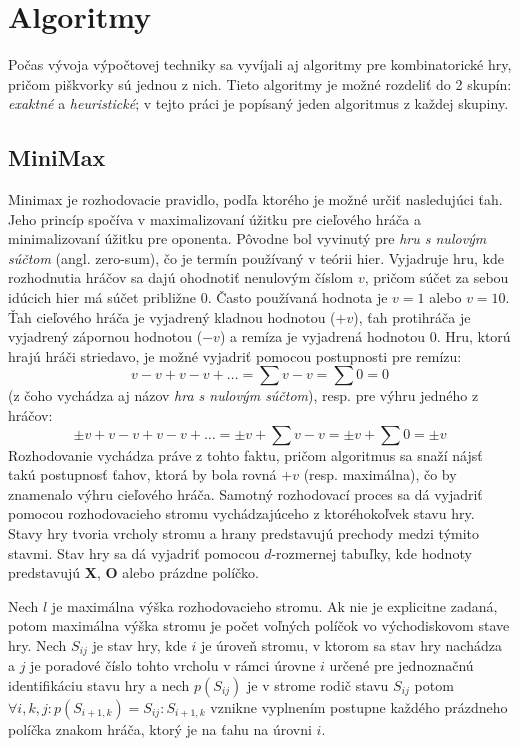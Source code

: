 \section{Algoritmy}\label{sec:algorithms}

Počas vývoja výpočtovej techniky sa vyvíjali aj algoritmy pre kombinatorické hry, pričom piškvorky sú jednou z nich.
Tieto algoritmy je možné rozdeliť do 2 skupín: \emph{exaktné} a \emph{heuristické}; v tejto práci je popísaný jeden
algoritmus z každej skupiny.

\subsection{MiniMax}\label{subsec:algo-minmax}


Minimax je rozhodovacie pravidlo, podľa ktorého je možné určiť nasledujúci ťah.
Jeho princíp spočíva v maximalizovaní úžitku pre cieľového hráča a minimalizovaní úžitku pre oponenta.
Pôvodne bol vyvinutý pre \emph{hru s nulovým súčtom} (angl. zero-sum), čo je termín používaný v teórii hier.
Vyjadruje hru, kde rozhodnutia hráčov sa dajú ohodnotiť nenulovým číslom $v$, pričom súčet za sebou idúcich hier má
súčet približne 0.
Často používaná hodnota je $v=1$ alebo $v=10$.
Ťah cieľového hráča je vyjadrený kladnou hodnotou ($+v$), ťah protihráča je vyjadrený zápornou hodnotou ($-v$) a remíza
je vyjadrená hodnotou $0$.
Hru, ktorú hrajú hráči striedavo, je možné vyjadriť pomocou postupnosti pre remízu:
\begin{equation}
    v-v+v-v+ \dots = \sum{v-v} = \sum{0} = 0
\end{equation}
(z čoho vychádza aj názov \emph{hra s nulovým súčtom}), resp. pre výhru jedného z hráčov:
\begin{equation}
    \pm v+v-v+v-v+ \dots = \pm v+\sum{v-v} = \pm v+\sum{0} = \pm v
\end{equation}
Rozhodovanie vychádza práve z tohto faktu, pričom algoritmus sa snaží nájsť takú postupnosť ťahov, ktorá by bola rovná
$+v$ (resp. maximálna), čo by znamenalo výhru cieľového hráča.
Samotný rozhodovací proces sa dá vyjadriť pomocou rozhodovacieho stromu vychádzajúceho z ktoréhokoľvek stavu hry.
Stavy hry tvoria vrcholy stromu a hrany predstavujú prechody medzi týmito stavmi.
Stav hry sa dá vyjadriť pomocou $d$-rozmernej tabuľky, kde hodnoty predstavujú \textbf{X}, \textbf{O} alebo prázdne
políčko.

Nech $l$ je maximálna výška rozhodovacieho stromu.
Ak nie je explicitne zadaná, potom maximálna výška stromu je počet voľných políčok vo východiskovom stave hry.
Nech $S_{ij}$ je stav hry, kde $i$ je úroveň stromu, v ktorom sa stav hry nachádza a $j$ je poradové číslo tohto vrcholu
v rámci úrovne $i$ určené pre jednoznačnú identifikáciu stavu hry a nech $p(S_{ij})$ je v strome rodič stavu $S_{ij}$
potom $\forall i, k, j \colon p(S_{i+1,k}) = S_{ij} \colon S_{i+1,k}$ vznikne vyplnením postupne každého
prázdneho políčka znakom hráča, ktorý je na ťahu na úrovni $i$.

